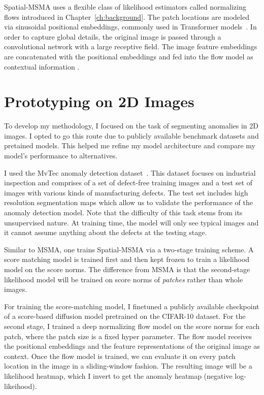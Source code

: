 Spatial-MSMA uses a flexible class of likelihood estimators called normalizing flows introduced in Chapter~\ref{ch:background}. The patch locations are modeled via sinusoidal positional embeddings, commonly used in Transformer models~\cite{vaswani}. In order to capture global details, the original image is passed through a convolutional network with a large receptive field. The image feature embeddings are concatenated with the positional embeddings and fed into the flow model as contextual information .

\section{Prototyping on 2D Images}

To develop my methodology, I focused on the task of segmenting anomalies in 2D images. I opted to go this route due to publicly available benchmark datasets and pretained models. This helped me refine my model architecture and compare my model's performance to alternatives.

I used the MvTec anomaly detection dataset~\cite{Bergmann_2019_CVPR}. This dataset focuses on industrial inspection and comprises of a set of defect-free training images and a test set of images with various kinds of manufacturing defects. The test set includes high resolution segmentation maps which allow us to validate the performance of the anomaly detection model. Note that the difficulty of this task stems from its unsupervised nature. At training time, the model will only see typical images and it cannot assume anything about the defects at the testing stage.

Similar to MSMA, one trains Spatial-MSMA via a two-stage training scheme. A score matching model is trained first and then kept frozen to train a likelihood model on the score norms. The difference from MSMA is that the second-stage likelihood model will be trained on score norms of \textit{patches} rather than whole images.

For training the score-matching model, I finetuned a publicly available checkpoint of a score-based diffusion model pretrained on the CIFAR-10 dataset. For the second stage, I trained a deep normalizing flow model on the score norms for each patch, where the patch size is a fixed hyper parameter. The flow model receives the positional embeddings and the feature representations of the original image as context. Once the flow model is trained, we can evaluate it on every patch location in the image in a sliding-window fashion. The resulting image will be a likelihood heatmap, which I invert to get the anomaly heatmap (negative log-likeihood).

